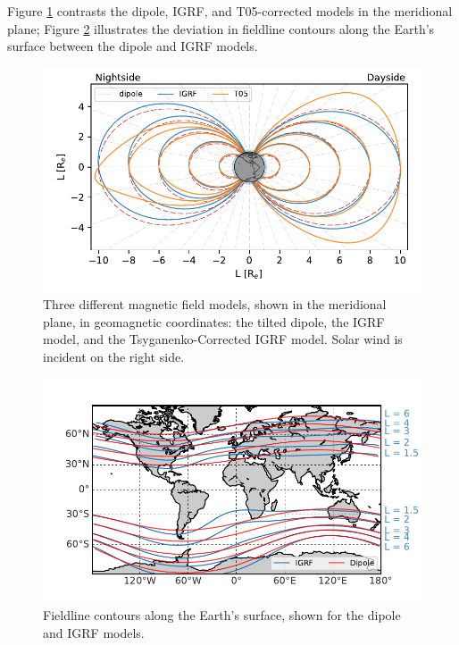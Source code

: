 Figure \ref{fig:fieldline_example} contrasts the dipole, IGRF, and T05-corrected models in the meridional plane; Figure \ref{fig:Lshell_example} illustrates the deviation in fieldline contours along the Earth's surface between the dipole and IGRF models.

\begin{figure}[t]
\begin{center}
\includegraphics{figures/fieldline_models.pdf}
\end{center}

\caption[Magnetic field models]{Three different magnetic field models, shown in the meridional plane, in geomagnetic coordinates: the tilted dipole, the IGRF model, and the Tsyganenko-Corrected IGRF model. Solar wind is incident on the right side.}
\label{fig:fieldline_example}
\end{figure}
\begin{figure}
\begin{center}
	\includegraphics{figures/Lshell_contours.pdf}
\end{center}
\caption[L-shell contours on the Earth's surface]{Fieldline contours along the Earth's surface, shown for the dipole and IGRF models.}
\label{fig:Lshell_example}
\end{figure}

